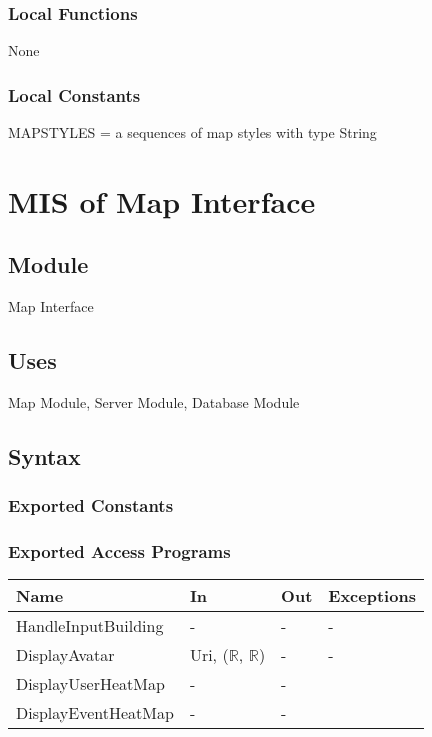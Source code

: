 \documentclass[12pt, titlepage]{article}
\begin{document}
\subsubsection{Local Functions}

None

\subsubsection{Local Constants}

MAPSTYLES = a sequences of map styles with type String
 
\newpage

\section{MIS of Map Interface} \label{mMapInterface}

\subsection{Module}

Map Interface

\subsection{Uses}

Map Module, Server Module, Database Module

\subsection{Syntax}

\subsubsection{Exported Constants}

\subsubsection{Exported Access Programs}

\begin{center}
\begin{tabular}{p{4cm} p{3cm} p{3cm} p{4cm}}
\hline
\textbf{Name} & \textbf{In} & \textbf{Out} & \textbf{Exceptions} \\
\hline
HandleInputBuilding & - & - & - \\
DisplayAvatar & Uri, ($\mathbb{R}$, $\mathbb{R}$) & - & -\\
DisplayUserHeatMap & - & -\\
DisplayEventHeatMap & - & -\\

\hline
\end{tabular}
\end{center}
\end{document}
